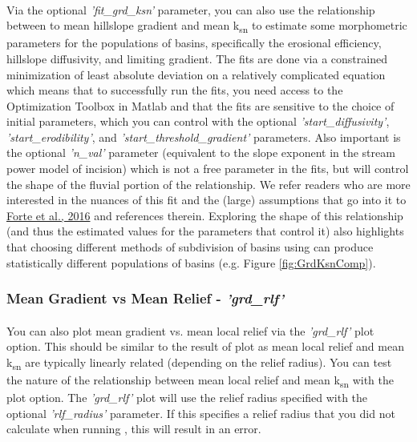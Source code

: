 \paragraph{}Via the optional \textit{'fit\_grd\_ksn'} parameter, you can also use the relationship between to mean hillslope gradient and mean k\textsubscript{sn} to estimate some morphometric parameters for the populations of basins, specifically the erosional efficiency, hillslope diffusivity, and limiting gradient. The fits are done via a constrained minimization of least absolute deviation on a relatively complicated equation which means that to successfully run the fits, you need access to the Optimization Toolbox in Matlab and that the fits are sensitive to the choice of initial parameters, which you can control with the optional \textit{'start\_diffusivity'}, \textit{'start\_erodibility'}, and \textit{'start\_threshold\_gradient'} parameters. Also important is the optional \textit{'n\_val'} parameter (equivalent to the slope exponent in the stream power model of incision) which is not a free parameter in the fits, but will control the shape of the fluvial portion of the relationship. We refer readers who are more interested in the nuances of this fit and the (large) assumptions that go into it to \href{https://www.sciencedirect.com/science/article/pii/S0012821X16303004}{Forte et al., 2016} and references therein. Exploring the shape of this relationship (and thus the estimated values for the parameters that control it) also highlights that choosing different methods of subdivision of basins using  can produce statistically different populations of basins (e.g. Figure \ref{fig:GrdKsnComp}). 

\subsubsection{Mean Gradient vs Mean Relief - \textit{'grd\_rlf'}} \label{sec:grdrlf}
\paragraph{}You can also plot mean gradient vs. mean local relief via the \textit{'grd\_rlf'} plot option. This should be similar to the result of  plot as mean local relief and mean k\textsubscript{sn} are typically linearly related (depending on the relief radius). You can test the nature of the relationship between mean local relief and mean k\textsubscript{sn} with the  plot option. The \textit{'grd\_rlf'} plot will use the relief radius specified with the optional \textit{'rlf\_radius'} parameter. If this specifies a relief radius that you did not calculate when running , this will result in an error.

